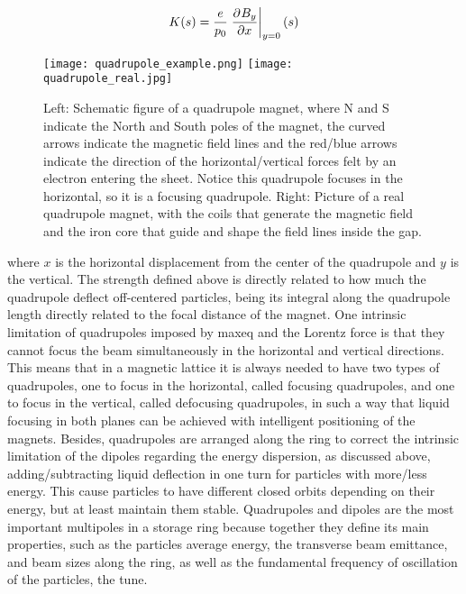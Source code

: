 \begin{description}[align=left]
        \begin{align}
            K(s) = \frac{e}{p_0}\left.\frac{\partial^{{}}B_y}{\partial x^{{}}}\right|_{y=0}(s)
        \end{align}
        \begin{figure}[t!]
            \center
            \texttt{[image: quadrupole\_example.png]}
            \texttt{[image: quadrupole\_real.jpg]}
            \caption[Example of quadrupole magnet.]{Left: Schematic figure of a quadrupole magnet, where N and S indicate the North and South poles of the magnet, the curved arrows indicate the magnetic field lines and the red/blue arrows indicate the direction of the horizontal/vertical forces felt by an electron entering the sheet. Notice this quadrupole focuses in the horizontal, so it is a focusing quadrupole. Right: Picture of a real quadrupole magnet, with the coils that generate the magnetic field and the iron core that guide and shape the field lines inside the gap.}
            \label{fig:quadrupole}
        \end{figure}
        where $x$ is the horizontal displacement from the center of the quadrupole and $y$ is the vertical. The strength defined above is directly related to how much the quadrupole deflect off-centered particles, being its integral along the quadrupole length directly related to the focal distance of the magnet. One intrinsic limitation of quadrupoles imposed by \gls{maxeq} and the Lorentz force is that they cannot focus the beam simultaneously in the horizontal and vertical directions. This means that in a magnetic lattice it is always needed to have two types of quadrupoles, one to focus in the horizontal, called focusing quadrupoles, and one to focus in the vertical, called defocusing quadrupoles, in such a way that liquid focusing in both planes can be achieved with intelligent positioning of the magnets. Besides, quadrupoles are arranged along the ring to correct the intrinsic limitation of the dipoles regarding the energy dispersion, as discussed above, adding/subtracting liquid deflection in one turn for particles with more/less energy. This cause particles to have different closed orbits depending on their energy, but at least maintain them stable. Quadrupoles and dipoles are the most important multipoles in a storage ring because together they define its main properties, such as the particles average energy, the transverse beam emittance, and beam sizes along the ring, as well as the fundamental frequency of oscillation of the particles, the tune.

\end{description}
